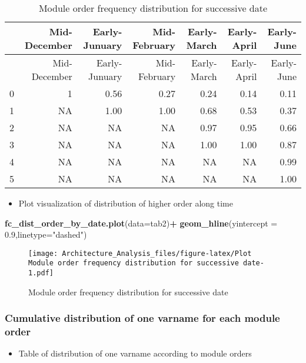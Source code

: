 \documentclass[]{article}
\newenvironment{Shaded}{\begin{snugshade}}{\end{snugshade}}
\newcommand{\KeywordTok}[1]{\textcolor[rgb]{0.13,0.29,0.53}{\textbf{#1}}}
\newcommand{\DataTypeTok}[1]{\textcolor[rgb]{0.13,0.29,0.53}{#1}}
\newcommand{\FloatTok}[1]{\textcolor[rgb]{0.00,0.00,0.81}{#1}}
\newcommand{\StringTok}[1]{\textcolor[rgb]{0.31,0.60,0.02}{#1}}
\newcommand{\OperatorTok}[1]{\textcolor[rgb]{0.81,0.36,0.00}{\textbf{#1}}}
\newcommand{\NormalTok}[1]{#1}
\providecommand{\tightlist}{%
  \setlength{\itemsep}{0pt}\setlength{\parskip}{0pt}}
\begin{document}
\begin{longtable}[]{@{}lrrrrrr@{}}
\caption{Module order frequency distribution for successive
date}\tabularnewline
\toprule
& Mid-December & Early-Junuary & Mid-February & Early-March &
Early-April & Early-June\tabularnewline
\midrule
\endfirsthead
\toprule
& Mid-December & Early-Junuary & Mid-February & Early-March &
Early-April & Early-June\tabularnewline
\midrule
\endhead
0 & 1 & 0.56 & 0.27 & 0.24 & 0.14 & 0.11\tabularnewline
1 & NA & 1.00 & 1.00 & 0.68 & 0.53 & 0.37\tabularnewline
2 & NA & NA & NA & 0.97 & 0.95 & 0.66\tabularnewline
3 & NA & NA & NA & 1.00 & 1.00 & 0.87\tabularnewline
4 & NA & NA & NA & NA & NA & 0.99\tabularnewline
5 & NA & NA & NA & NA & NA & 1.00\tabularnewline
\bottomrule
\end{longtable}

\begin{itemize}
\tightlist
\item
  Plot visualization of distribution of higher order along time
\end{itemize}

\begin{Shaded}
\begin{Highlighting}[]
\KeywordTok{fc_dist_order_by_date.plot}\NormalTok{(}\DataTypeTok{data=}\NormalTok{tab2)}\OperatorTok{+}
\StringTok{  }\KeywordTok{geom_hline}\NormalTok{(}\DataTypeTok{yintercept =} \FloatTok{0.9}\NormalTok{,}\DataTypeTok{linetype=}\StringTok{"dashed"}\NormalTok{)}
\end{Highlighting}
\end{Shaded}

\begin{figure}
\centering
\texttt{[image: Architecture\_Analysis\_files/figure-latex/Plot Module order frequency distribution for successive date-1.pdf]}
\caption{Module order frequency distribution for successive date}
\end{figure}

\subsubsection{Cumulative distribution of one varname for each module
order}\label{cumulative-distribution-of-one-varname-for-each-module-order}

\begin{itemize}
\tightlist
\item
  Table of distribution of one varname according to module orders
\end{itemize}
\end{document}
